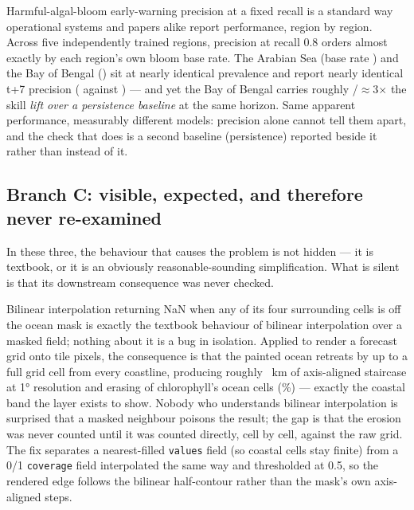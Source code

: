  Harmful-algal-bloom early-warning precision at a
fixed recall is a standard way operational systems and papers alike report
performance, region by region. Across five independently trained regions,
precision at recall 0.8 orders almost exactly by each region's own bloom
base rate. The Arabian Sea (base rate \HabArabianBase{}) and the Bay of
Bengal (\HabBengalBase{}) sit at nearly identical prevalence and report
nearly identical t+7 precision (\HabArabianPrecSeven{} against
\HabBengalPrecSeven{}) --- and yet the Bay of Bengal carries roughly
\HabBengalLiftSeven{}/\HabArabianLiftSeven{}$\approx$3$\times$ the skill \emph{lift
over a persistence baseline} at the same horizon. Same apparent
performance, measurably different models: precision alone cannot tell them
apart, and the check that does is a second baseline (persistence) reported
beside it rather than instead of it.

\subsection{Branch C: visible, expected, and therefore never re-examined}
\label{sec:branch-c}

In these three, the behaviour that causes the problem is not hidden --- it
is textbook, or it is an obviously reasonable-sounding simplification. What
is silent is that its downstream consequence was never checked.

Bilinear interpolation returning NaN when any of its four surrounding cells
is off the ocean mask is exactly the textbook behaviour of bilinear
interpolation over a masked field; nothing about it is a bug in isolation.
Applied to render a forecast grid onto tile pixels, the consequence is that
the painted ocean retreats by up to a full grid cell from every coastline,
producing roughly \BilinearStaircaseKm{}~km of axis-aligned staircase at
1\si{\degree} resolution and erasing \BilinearErasedCells{} of chlorophyll's
\BilinearTotalCells{} ocean cells (\BilinearErasedPct{}\%) --- exactly the
coastal band the layer exists to show. Nobody who understands bilinear
interpolation is surprised that a masked neighbour poisons the result; the
gap is that the erosion was never counted until it was counted directly,
cell by cell, against the raw grid. The fix separates a nearest-filled
\texttt{values} field (so coastal cells stay finite) from a 0/1
\texttt{coverage} field interpolated the same way and thresholded at 0.5, so
the rendered edge follows the bilinear half-contour rather than the mask's
own axis-aligned steps.

